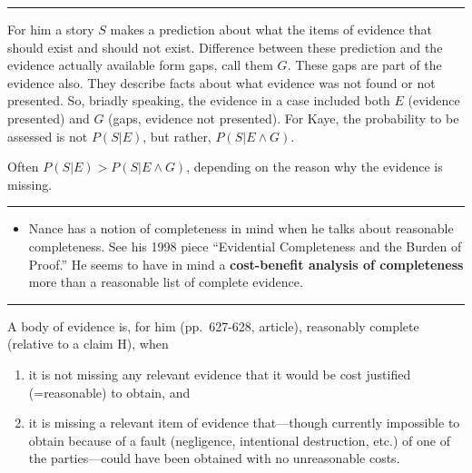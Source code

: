 \documentclass[
  10pt,
  dvipsnames,enabledeprecatedfontcommands]{scrartcl}
\providecommand{\tightlist}{%
  \setlength{\itemsep}{0pt}\setlength{\parskip}{0pt}}
\begin{document}
\begin{center}\rule{0.5\linewidth}{0.5pt}\end{center}

For him a story \(S\) makes a prediction about what the items of
evidence that should exist and should not exist. Difference between
these prediction and the evidence actually available form gaps, call
them \(G\). These gaps are part of the evidence also. They describe
facts about what evidence was not found or not presented. So, briadly
speaking, the evidence in a case included both \(E\) (evidence
presented) and \(G\) (gaps, evidence not presented). For Kaye, the
probability to be assessed is not \(P(S \vert E)\), but rather,
\(P(S \vert E \wedge G)\).

Often \(P(S \vert E) > P(S \vert E \wedge G)\), depending on the reason
why the evidence is missing.


\begin{center}\rule{0.5\linewidth}{0.5pt}\end{center}

\begin{itemize}
\tightlist
\item
  Nance has a notion of completeness in mind when he talks about
  reasonable completeness. See his 1998 piece ``Evidential Completeness
  and the Burden of Proof.'' He seems to have in mind a
  \textbf{cost-benefit analysis of completeness} more than a reasonable
  list of complete evidence.
\end{itemize}

\begin{center}\rule{0.5\linewidth}{0.5pt}\end{center}

A body of evidence is, for him (pp.~627-628, article), reasonably
complete (relative to a claim H), when

\begin{enumerate}
\def\labelenumi{(\alph{enumi})}
\item
  it is not missing any relevant evidence that it would be cost
  justified (=reasonable) to obtain, and
\item
  it is missing a relevant item of evidence that---though currently
  impossible to obtain because of a fault (negligence, intentional
  destruction, etc.) of one of the parties---could have been obtained
  with no unreasonable costs.
\end{enumerate}
\end{document}
